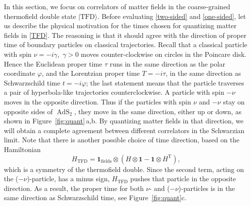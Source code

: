 \documentclass[12pt]{article}
\newcommand{\be}{\begin{equation}}
\newcommand{\ee}{\end{equation}}
\newcommand{\lt}{\left}
\newcommand{\rt}{\right}
\newcommand*{\ket}[1]{|{#1}\rangle}
\newcommand{\vp}{\varphi}
\newcommand{\Tt}{\mathrm{T}}
\DeclareMathOperator{\tAdS}{\widetilde{AdS}}
\newcommand{\unit}{\mathbf{1}}
\def\widetilde#1{#1}%
\begin{document}
In this section, we focus on correlators of matter fields in the coarse-grained thermofield double state $\ket{\text{TFD}}$. Before evaluating \eqref{two-sided} and \eqref{one-sided}, let us describe the physical motivation for the times chosen for quantizing matter fields in \eqref{TFD}. The reasoning is that it should agree with the direction of proper time of boundary particles on classical trajectories. Recall that a classical particle with spin $\nu=-i\gamma$,\, $\gamma>0$ moves counter-clockwise on circles in the Poincare disk. Hence the Euclidean proper time $\tau$ runs in the same direction as the polar coordinate $\vp$, and the Lorentzian proper time $T=-i\tau$, in the same direction as Schwarzschild time $t=-i\vp$; the last statement means that the particle traverses a pair of hyperbola-like trajectories counterclockwise. A particle with spin $-\nu$ moves in the opposite direction. Thus if the particles with spin $\nu$ and $-\nu$ stay on opposite sides of $\tAdS_2$, they move in the same direction, either up or down, as shown in Figure~\ref{fig:quant}\,a,b. By quantizing matter fields in that direction, we will obtain a complete agreement between different correlators in the Schwarzian limit. Note that there is another possible choice of time direction, based on the Hamiltonian
\be \label{H_TFD}
H_{\text{TFD}}=\unit_{\text{fields}} \otimes \lt(H \otimes \unit - \unit \otimes H^{\Tt}\rt),
\ee
which is a symmetry of the thermofield double. Since the second term, acting on the ($-\nu$)-particle, has a minus sign, $H_{\text{TFD}}$ pushes that particle in the opposite direction. As a result, the proper time for both $\nu$- and ($-\nu$)-particles is in the same direction as Schwarzschild time, see Figure~\ref{fig:quant}c.
\end{document}
